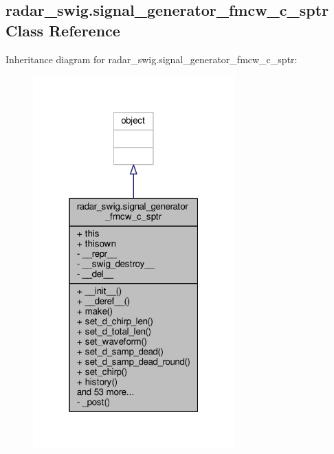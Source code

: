 \subsection{radar\+\_\+swig.\+signal\+\_\+generator\+\_\+fmcw\+\_\+c\+\_\+sptr Class Reference}
\label{classradar__swig_1_1signal__generator__fmcw__c__sptr}


Inheritance diagram for radar\+\_\+swig.\+signal\+\_\+generator\+\_\+fmcw\+\_\+c\+\_\+sptr\+:
\nopagebreak
\begin{figure}[H]
\begin{center}
\leavevmode
\includegraphics[width=220pt]{d7/d2e/classradar__swig_1_1signal__generator__fmcw__c__sptr__inherit__graph}
\end{center}
\end{figure}


